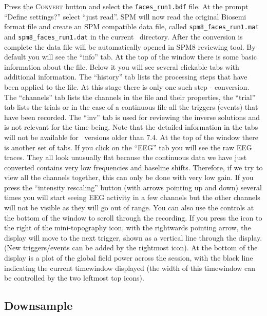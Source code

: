 Press the \textsc{Convert} button and select the \texttt{faces\_run1.bdf} file. At the prompt ``Define settings?'' select ``just read''.
SPM will now read the original Biosemi format file and create an SPM compatible data file, called \texttt{spm8\_faces\_run1.mat} and \texttt{spm8\_faces\_run1.dat} in the current \matlab\ directory. After the conversion is complete the data file will be automatically opened in SPM8 reviewing tool. By default you will see the ``info'' tab. At the top of the window there is some basic information about the file. Below it you will see several clickable tabs with additional information. The ``history'' tab lists the processing steps that have been applied to the file. At this stage there is only one such step - conversion. The ``channels'' tab lists the channels in the file and their properties, the ``trial'' tab lists the trials or in the case of a continuous file all the triggers (events) that have been recorded. The ``inv'' tab is used for reviewing the inverse solutions and is not relevant for the time being. Note that the detailed information in the tabs will not be available for \matlab\ versions older than 7.4.  At the top of the window there is another set of tabs. If you click on the ``EEG'' tab you will see the raw EEG traces. They all look unusually flat because the continuous data we have just converted contains very low frequencies and baseline shifts. Therefore, if we try to view all the channels together, this can only be done with very low gain.
If you press the ``intensity rescaling'' button (with arrows pointing up and down) several times you will start seeing EEG activity in a few channels but the other channels will not be visible as they will go out of range. You can also use the controls at the bottom of the window to scroll through the recording. If you press the icon to the right of the mini-topography icon, with the rightwards pointing arrow, the display will move to the next trigger, shown as a vertical line through the display. (New triggers/events can be added by the rightmost icon). At the bottom of the display is a plot of the global field power across the session, with the black line indicating the current timewindow displayed (the width of this timewindow can be controlled by the two leftmost top icons).

\subsection{Downsample}

